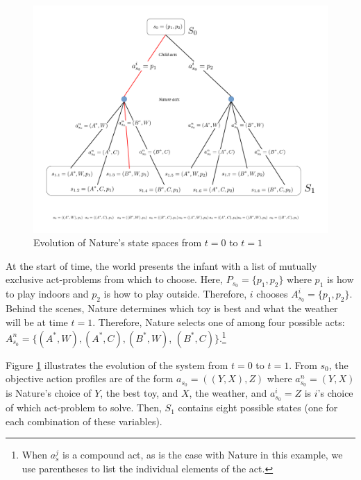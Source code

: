 \documentclass[
11pt,
titlepage,
reqno,
]{article}%
\theoremstyle{definition}
\begin{document}
\begin{figure}[h!]
	\centering
	\includegraphics*[page=1,trim = 0in 1in 0in 0in,scale=.6]{Awareness_Diagrams_All}
	\caption{Evolution of Nature's state spaces from $t=0$ to $t=1$\label{Diag: p-01}}%
\end{figure}

At the start of time, the world presents the infant with a list of mutually exclusive act-problems from which to choose. 
Here, $P_{s_0}=\{p_1,p_2\}$ where $p_1$ is how to play indoors and $p_2$ is how to play outside.
Therefore, $i$ chooses  $A^i_{s_0}=\{p_1,p_2\}$.
Behind the scenes, Nature determines which toy is best and what the weather will be at time $t=1$.
Therefore, Nature selects one of among four possible acts: $A^n_{s_0}=\{(A^\ast,W),(A^\ast,C),(B^\ast,W)$, $(B^\ast,C)\}$.\footnote
{
	When $a^j_s$ is a compound act, as is the case with Nature in this example, we use parentheses to list the individual elements of the act.
}


Figure \ref{Diag: p-01} illustrates the evolution of the system from $t=0$ to $t=1$. 
From $s_0$, the objective action profiles are of the form $a_{s_0}=((Y,X),Z)$ where $a^n_{s_0}=(Y,X)$ is Nature's choice of  $Y$, the best toy, and $X$, the weather, and $a^i_{s_0}=Z$ is $i$'s choice of which act-problem to solve.
Then, $S_1$ contains eight possible states (one for each combination of these variables).
\end{document}
